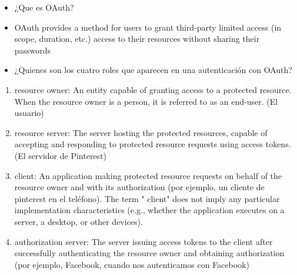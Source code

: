 \begin{itemize}
\itemsep1pt\parskip0pt
\item
  ¿Que es OAuth?
\item
  OAuth provides a method for users to grant third-party limited access
  (in scope, duration, etc.) access to their resources without sharing
  their passwords
\item
  ¿Quienes son los cuatro roles que aparecen en una autenticación con
  OAuth?
\end{itemize}

\begin{enumerate}
\def\labelenumi{\arabic{enumi}.}
\itemsep1pt\parskip0pt
\item
  resource owner: An entity capable of granting access to a protected
  resource. When the resource owner is a person, it is referred to as an
  end-user. (El usuario)
\item
  resource server: The server hosting the protected resources, capable
  of accepting and responding to protected resource requests using
  access tokens. (El servidor de Pinterest)
\item
  client: An application making protected resource requests on behalf of
  the resource owner and with its authorization (por ejemplo, un cliente
  de pinterest en el teléfono). The term " client" does not imply any
  particular implementation characteristics (e.g., whether the
  application executes on a server, a desktop, or other devices).
\item
  authorization server: The server issuing access tokens to the client
  after successfully authenticating the resource owner and obtaining
  authorization (por ejemplo, Facebook, cuando nos autenticamos con
  Facebook)
\end{enumerate}

